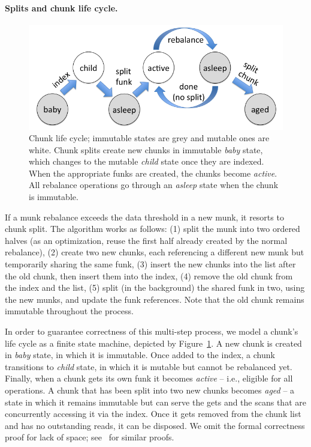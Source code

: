 \paragraph{Splits and chunk life cycle.} 
\begin{figure}[tb]
\centerline{
\includegraphics[width=.8\columnwidth]{state-diagram.png}
}
\caption{Chunk life cycle; immutable states are grey and mutable ones are white.
Chunk splits  create new chunks in immutable \emph{baby} state, which changes to the mutable \emph{child} state once they 
are indexed. When the appropriate funks are created, the chunks become \emph{active}. All rebalance operations go through an 
\emph{asleep} state when the chunk is immutable.}
\label{fig:chunklife}
\end{figure}

If a munk rebalance exceeds the data threshold in a new munk, it resorts to chunk split. The algorithm works as 
follows: (1) split the munk into two ordered halves (as an optimization, reuse the first half already
created by the normal rebalance), (2) create two new chunks, each referencing a different new munk
but temporarily sharing the same funk, (3) insert the new chunks into the list after the old chunk, then insert them 
into the index, (4) remove the old chunk from the index and the list, (5) split (in the background) the shared 
funk in two, using the new munks, and update the funk references. Note that the old chunk remains immutable
throughout the process. 

In order to guarantee correctness of this multi-step process, we model a chunk's life cycle as a finite state machine, 
depicted by Figure~\ref{fig:chunklife}. A new chunk is created in \emph{baby} state, in which it is immutable. Once added 
to the index, a chunk transitions to \emph{child} state, in which it is mutable but cannot be rebalanced yet. Finally, when 
a chunk gets its own funk it becomes \emph{active} -- i.e., eligible for all operations. A chunk that has been split into 
two new chunks becomes \emph{aged} -- a state in which it remains immutable but can serve the gets and the scans 
that are concurrently accessing it via the index. Once it gets removed from the chunk list and has no outstanding
reads, it can be disposed. We omit the formal correctness proof for lack of space; see~\cite{kiwi} for similar proofs.   

